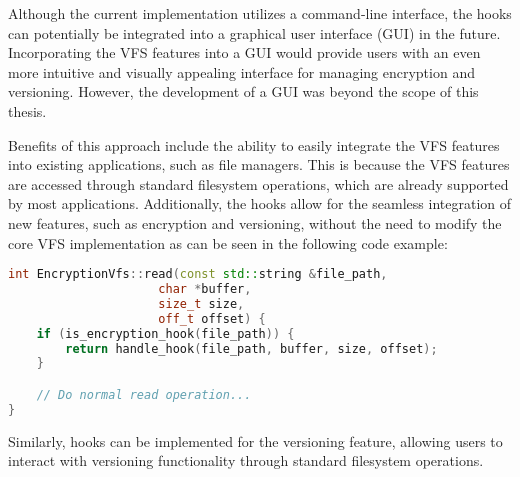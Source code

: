 Although the current implementation utilizes a command-line interface, the hooks can potentially be integrated into a graphical user interface (GUI) in the future.
Incorporating the VFS features into a GUI would provide users with an even more intuitive and visually appealing interface for managing encryption and versioning.
However, the development of a GUI was beyond the scope of this thesis.

Benefits of this approach include the ability to easily integrate the VFS features into existing applications, such as file managers.
This is because the VFS features are accessed through standard filesystem operations, which are already supported by most applications.
Additionally, the hooks allow for the seamless integration of new features, such as encryption and versioning, without the need to modify the core VFS implementation as can be seen in the following code example:

\begin{lstlisting}[language=c++, basicstyle=\ttfamily\small]
int EncryptionVfs::read(const std::string &file_path,
                     char *buffer,
                     size_t size,
                     off_t offset) {
    if (is_encryption_hook(file_path)) {
        return handle_hook(file_path, buffer, size, offset);
    }

    // Do normal read operation...
}
\end{lstlisting}

Similarly, hooks can be implemented for the versioning feature, allowing users to interact with versioning functionality through standard filesystem operations.




